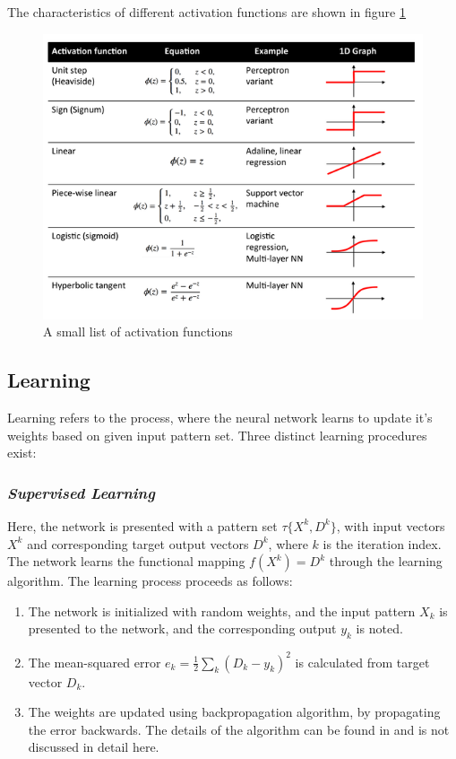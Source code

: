 \documentclass[12pt, onecolumn]{extarticle}
\begin{document}
 	The characteristics of different activation functions are shown in figure \ref{fig:activationfunctions}
\begin{figure}[h]
	\centering
	\includegraphics[width=0.8\linewidth]{activation_functions}
	\caption{A small list of activation functions}
	\label{fig:activationfunctions}
\end{figure}

\subsection{\textbf{Learning}} Learning refers to the process, where the neural network learns to update it's weights based on given input pattern set. Three distinct learning procedures exist: \\ 

\subsubsection{\textit{Supervised Learning}} Here, the network is presented with a pattern set $ \tau\{X^{k}, D^{k}\} $, with input vectors $ X^{k} $ and corresponding target output vectors $ D^{k} $, where $ k $ is the iteration index. The network learns the functional mapping $ f(X^{k}) = D^{k} $ through the learning algorithm. The learning process proceeds as follows: \\ \begin{enumerate}
	\item The network is initialized with random weights, and the input pattern $ X_{k} $ is presented to the network, and the corresponding output $ y_{k} $ is noted. \\
	\item The mean-squared error $ e_{k} = \frac{1}{2}\sum_{k}(D_{k}-y_{k})^{2} $ is calculated from target vector $ D_{k} $. \\
	\item The weights are updated using backpropagation algorithm, by propagating the error backwards. The details of the algorithm can be found in 
	and is not discussed in detail here. \\
\end{enumerate}
\end{document}

